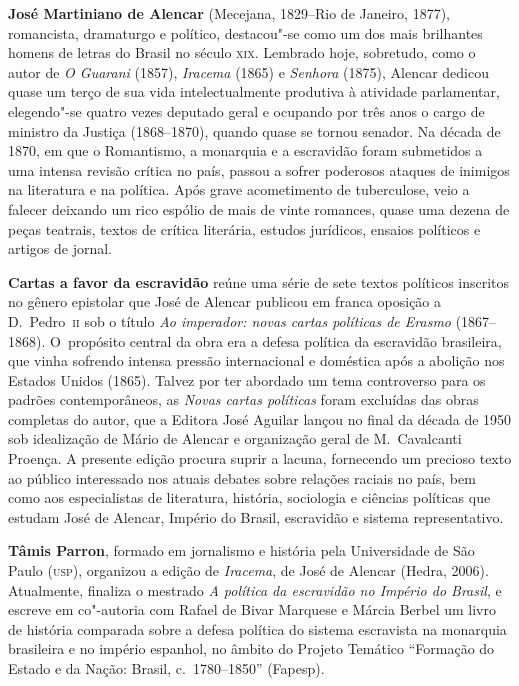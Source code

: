 \textbf{José Martiniano de Alencar} (Mecejana, 1829--Rio de Janeiro, 1877), romancista, dramaturgo e político, destacou"-se como um dos mais brilhantes homens de letras do Brasil no século \textsc{xix}. Lembrado hoje, sobretudo, como o autor de \textit{O Guarani} (1857), \textit{Iracema} (1865) e \textit{Senhora} (1875), Alencar dedicou quase um terço de sua vida intelectualmente produtiva à atividade parlamentar, elegendo"-se quatro vezes deputado geral e ocupando por três anos o cargo de ministro da Justiça (1868--1870), quando quase se tornou senador. Na década de 1870, em que o Romantismo, a monarquia e a escravidão foram submetidos a uma intensa revisão crítica no país, passou a sofrer poderosos ataques de inimigos na literatura e na política. Após grave acometimento de tuberculose, veio a falecer deixando um rico espólio de mais de vinte romances, quase uma dezena de peças teatrais, textos de crítica literária, estudos jurídicos, ensaios políticos e artigos de jornal. 

\textbf{Cartas a favor da escravidão} reúne uma série de sete textos políticos inscritos 
no gênero epistolar que José de Alencar publicou em franca oposição a D.~Pedro~\textsc{ii} sob o título \textit{Ao imperador: novas cartas políticas de Erasmo} (1867--1868). \mbox{O propósito} central da obra era a defesa política da escravidão brasileira, que vinha sofrendo intensa pressão internacional e doméstica após a abolição nos Estados Unidos (1865). Talvez por ter abordado um tema controverso para os padrões contemporâneos, as \textit{Novas cartas políticas} foram excluídas das obras completas do autor, que a Editora José Aguilar lançou no final da década de 1950 sob idealização de Mário de Alencar e organização geral de M.~Cavalcanti Proença. A presente edição procura suprir a lacuna, fornecendo um precioso texto ao público interessado nos atuais debates sobre relações raciais no país, bem como aos especialistas de literatura, história, sociologia e ciências políticas que estudam José de Alencar, Império do Brasil, escravidão e sistema representativo.
 
\textbf{Tâmis Parron}, formado em jornalismo e história pela Universidade de São
Paulo (\textsc{usp}), organizou a edição de \textit{Iracema}, de José de Alencar
(Hedra, 2006). Atualmente, finaliza o mestrado \textit{A política da escravidão
no Império do Brasil}, e escreve em co"-autoria com Rafael de Bivar Marquese e
Márcia Berbel um livro de história comparada sobre a defesa política do sistema
escravista na monarquia brasileira e no império espanhol, no âmbito do Projeto
Temático ``Formação do Estado e da Nação: Brasil, c.~1780--1850'' (Fapesp).


